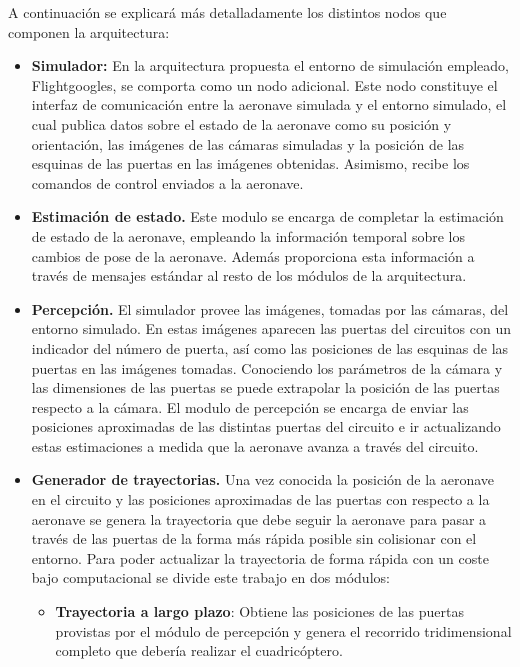 A continuación se explicará más detalladamente los distintos nodos que componen la arquitectura:
\begin{itemize}
	
	\item \textbf{Simulador:} En la arquitectura propuesta el entorno de simulación empleado, Flightgoogles, se comporta como un nodo adicional. Este nodo constituye el interfaz de comunicación entre la aeronave simulada y el entorno simulado,
	el cual publica datos sobre el estado de la aeronave como su posición y orientación, las imágenes de las cámaras simuladas y la posición de las esquinas de las puertas en las imágenes obtenidas. Asimismo, recibe los comandos de control enviados a la aeronave.
	 
	\item \textbf{Estimación de estado.} Este modulo se encarga de completar la estimación de estado de la aeronave, empleando la información temporal sobre los cambios de pose de la aeronave. Además proporciona esta información a través de mensajes estándar al resto de los módulos de la arquitectura.
	
	\item \textbf{Percepción.} El simulador provee las imágenes, tomadas por las cámaras, del entorno simulado. En estas imágenes aparecen las puertas del circuitos con un indicador del número de puerta, así como las posiciones de las esquinas de las puertas en las imágenes tomadas. Conociendo los parámetros de la cámara y las dimensiones de las puertas se puede extrapolar la posición de las puertas respecto a la cámara. El modulo de percepción se encarga de enviar las posiciones aproximadas de las distintas puertas del circuito e ir actualizando estas estimaciones a medida que la aeronave avanza a través del circuito.
	
	\item \textbf{Generador de trayectorias.} Una vez conocida la posición de la aeronave en el circuito y las posiciones aproximadas de las puertas con respecto a la aeronave se genera la trayectoria que debe seguir la aeronave para pasar a través de las puertas de la forma más rápida posible sin colisionar con el entorno. Para poder actualizar la trayectoria de forma rápida con un coste bajo computacional se divide este trabajo en dos módulos:
	
	\begin{itemize}
		\item \textbf{Trayectoria a largo plazo}: Obtiene las posiciones de las puertas provistas por el módulo de percepción y genera el recorrido tridimensional completo que debería realizar el cuadricóptero. 
		

\end{itemize}
\end{itemize}
